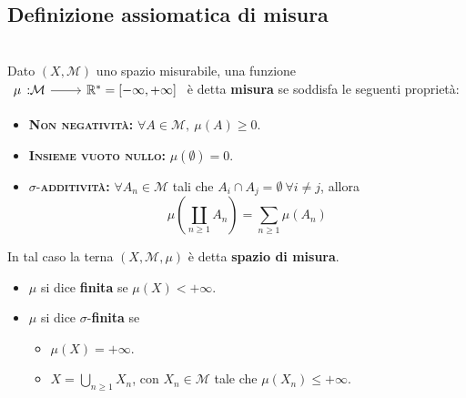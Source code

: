 \subsection{Definizione assiomatica di misura}
\begin{define}~{}\\
	Dato $\left(X,\mathcal{M}\right)$ uno spazio misurabile, una funzione $\funz{\mu}{\mathcal{M}}{\realset^{\ast}=\left[-\infty,+\infty\right]}$ è detta \textbf{misura} se soddisfa le seguenti proprietà:
	\begin{itemize}
		\item \textsc{\textbf{Non negatività:}} $\forall A\in\mathcal{M},\ \mu\left(A\right)\geq 0$.
		\item \textsc{\textbf{Insieme vuoto nullo:}} $\mu\left(\emptyset\right)=0$.
		\item $\sigma$-\textsc{\textbf{additività:}} $\forall A_n\in\mathcal{M}$ tali che $A_i\cap A_j=\emptyset\ \forall i\neq j$, allora
		\begin{equation}
			\mu\left(\coprod_{n\geq 1}A_n\right)=\sum_{n\geq 1}\mu\left(A_n\right)
		\end{equation}
	\end{itemize}
	In tal caso la terna $\left(X,\mathcal{M},\mu\right)$ è detta \textbf{spazio di misura}.
	\begin{itemize}
		\item $\mu$ si dice \textbf{finita} se $\mu\left(X\right)<+\infty$.
		\item $\mu$ si dice $\sigma$-\textbf{finita} se
		\begin{itemize}
			\item $\mu\left(X\right)=+\infty$.
			\item $\displaystyle X=\bigcup_{n\geq 1}X_n$, con $X_n\in\mathcal{M}$ tale che $\mu\left(X_n\right)\leq +\infty$.
		\end{itemize}
	\end{itemize}
\end{define}

